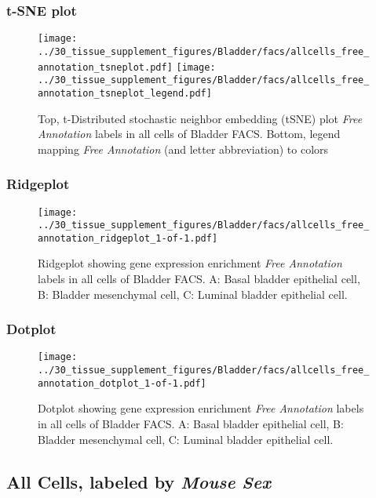 \clearpage
\subsubsection{t-SNE plot}
\begin{figure}[h]
\centering
\texttt{[image: ../30\_tissue\_supplement\_figures/Bladder/facs/allcells\_free\_annotation\_tsneplot.pdf]}
\texttt{[image: ../30\_tissue\_supplement\_figures/Bladder/facs/allcells\_free\_annotation\_tsneplot\_legend.pdf]}
\caption{Top, t-Distributed stochastic neighbor embedding (tSNE) plot  \emph{Free Annotation} labels in all cells of Bladder FACS. Bottom, legend mapping \emph{Free Annotation} (and letter abbreviation) to colors}
\end{figure}


\clearpage

\subsubsection{Ridgeplot}
\begin{figure}[h]
\centering
\texttt{[image: ../30\_tissue\_supplement\_figures/Bladder/facs/allcells\_free\_annotation\_ridgeplot\_1-of-1.pdf]}

\caption{ Ridgeplot  showing gene expression enrichment \emph{Free Annotation} labels in all cells of Bladder FACS. A: Basal bladder epithelial cell, B: Bladder mesenchymal cell, C: Luminal bladder epithelial cell.}
\end{figure}


\clearpage

\subsubsection{Dotplot}
\begin{figure}[h]
\centering
\texttt{[image: ../30\_tissue\_supplement\_figures/Bladder/facs/allcells\_free\_annotation\_dotplot\_1-of-1.pdf]}

\caption{ Dotplot  showing gene expression enrichment \emph{Free Annotation} labels in all cells of Bladder FACS. A: Basal bladder epithelial cell, B: Bladder mesenchymal cell, C: Luminal bladder epithelial cell.}
\end{figure}


\clearpage

\subsection{All Cells, labeled by \emph{Mouse Sex}}
